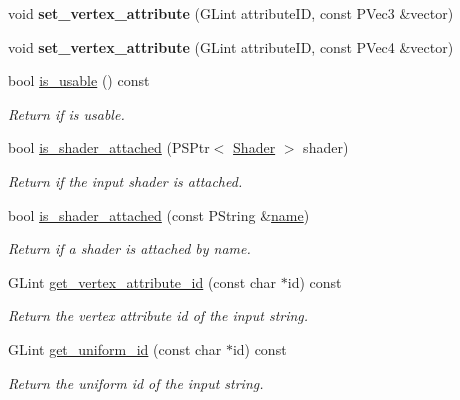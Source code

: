 \begin{DoxyCompactItemize}
\item 
\mbox{\label{classprz_1_1_shader___program_a24efda3df9e06e65e230803461ab9c3b}} 
void {\bfseries set\+\_\+vertex\+\_\+attribute} (G\+Lint attribute\+ID, const P\+Vec3 \&vector)
\item 
\mbox{\label{classprz_1_1_shader___program_a3f19847bcff7a3f16bdac721cf6472d1}} 
void {\bfseries set\+\_\+vertex\+\_\+attribute} (G\+Lint attribute\+ID, const P\+Vec4 \&vector)
\item 
bool \mbox{\hyperlink{classprz_1_1_shader___program_a5e49c8f33174f2e198d7e9a2928f2be6}{is\+\_\+usable}} () const
\begin{DoxyCompactList}\small\item\em Return if is usable. \end{DoxyCompactList}\item 
bool \mbox{\hyperlink{classprz_1_1_shader___program_adacc3a06016c7950b3099a753f7f8570}{is\+\_\+shader\+\_\+attached}} (P\+S\+Ptr$<$ \mbox{\hyperlink{classprz_1_1_shader}{Shader}} $>$ shader)
\begin{DoxyCompactList}\small\item\em Return if the input shader is attached. \end{DoxyCompactList}\item 
bool \mbox{\hyperlink{classprz_1_1_shader___program_aa23dbf1cfa870b98ac1afad31e4a15bc}{is\+\_\+shader\+\_\+attached}} (const P\+String \&\mbox{\hyperlink{classprz_1_1_shader___program_ab6eacdeb0d1733ea9ba6abfa00c34fe8}{name}})
\begin{DoxyCompactList}\small\item\em Return if a shader is attached by name. \end{DoxyCompactList}\item 
G\+Lint \mbox{\hyperlink{classprz_1_1_shader___program_a10cfe69aaa44702980a02bb188f690b1}{get\+\_\+vertex\+\_\+attribute\+\_\+id}} (const char $\ast$id) const
\begin{DoxyCompactList}\small\item\em Return the vertex attribute id of the input string. \end{DoxyCompactList}\item 
G\+Lint \mbox{\hyperlink{classprz_1_1_shader___program_afe3de8262b16d85fe6e11519398c6dc9}{get\+\_\+uniform\+\_\+id}} (const char $\ast$id) const
\begin{DoxyCompactList}\small\item\em Return the uniform id of the input string. \end{DoxyCompactList}\item 

\end{DoxyCompactItemize}

